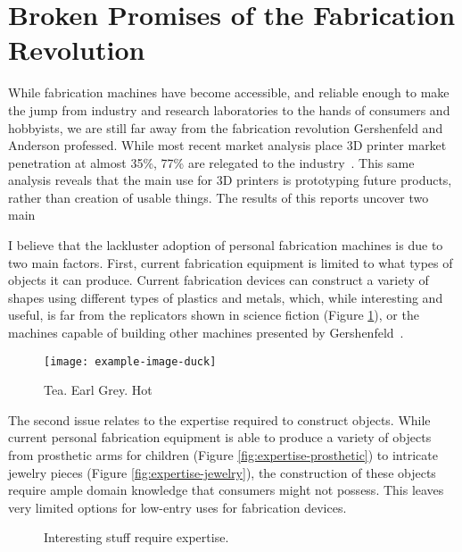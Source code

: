   \section{Broken Promises of the Fabrication Revolution}
    While fabrication machines have become accessible, and reliable enough to
    make the jump from industry and research laboratories to the hands of
    consumers and hobbyists, we are still far away from the fabrication
    revolution Gershenfeld and Anderson professed. While most recent market
    analysis place 3D printer market penetration at almost 35\%, 77\% are
    relegated to the industry~\cite{}. This same analysis reveals that the main
    use for 3D printers is prototyping future products, rather than creation of
    usable things. The results of this reports uncover two main

    I believe that the lackluster adoption of personal fabrication machines is
    due to two main factors. First, current fabrication equipment is limited to
    what types of objects it can produce. Current fabrication devices can
    construct a variety of shapes using different types of plastics and metals,
    which, while interesting and useful, is far from the replicators shown in
    science fiction (Figure \ref{fig:replicator}), or the machines capable of
    building other machines presented by Gershenfeld~\cite{Gershenfeld:2005}.

    \begin{figure}[h]
      \centering
      \texttt{[image: example-image-duck]}
      \label{fig:replicator}
      \caption{Tea. Earl Grey. Hot}
    \end{figure}

    The second issue relates to the expertise required to construct
     objects. While current personal fabrication equipment is
    able to produce a variety of  objects from prosthetic arms
    for children (Figure \ref{fig:expertise-prosthetic}) to intricate jewelry
    pieces (Figure \ref{fig:expertise-jewelry}), the construction of these
    objects require ample domain knowledge that consumers might not possess.
    This leaves very limited options for low-entry uses for fabrication devices.

    \begin{figure}[h]
      \centering
       \hfill
      \label{}

      \caption{Interesting stuff require expertise.}
    \end{figure}

